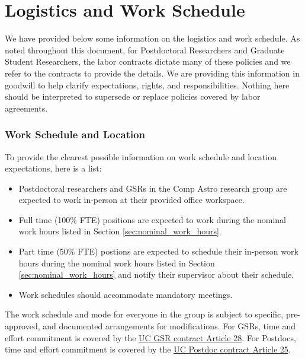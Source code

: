 \section{Logistics and Work Schedule}
\label{sec:logistics}

We have provided below some information on the logistics and work schedule. As noted throughout this document, for Postdoctoral Researchers and Graduate Student Researchers, the labor contracts dictate many of these policies and we refer to the contracts to provide the details. We are providing this information in goodwill to help
clarify expectations, rights, and responsibilities. Nothing here should be interpreted to supersede or replace
policies covered by labor agreements.


\subsubsection{Work Schedule and Location}

To provide the clearest possible information on work schedule and location expectations, here is a list:

\begin{itemize}
	\item Postdoctoral researchers and GSRs in the Comp Astro research group are expected to work in-person at their provided office workspace.
	\item Full time (100\% FTE) positions are expected to work during the nominal work hours listed in Section \ref{sec:nominal_work_hours}.
	\item Part time (50\% FTE) postions are expected to schedule their in-person work hours during the nominal work hours listed in Section \ref{sec:nominal_work_hours} and notify their supervisor about their schedule.
	\item Work schedules should accommodate mandatory meetings.
\end{itemize}

\noindent
The work schedule and mode for everyone in the group is subject to specific, pre-approved, and documented arrangements for modifications. For GSRs, time and effort commitment is covered by the \href{https://qa.ucnet.universityofcalifornia.edu/labor/bargaining-units/br/docs/br_28_time-and-effort-commitment_2022-2025.pdf}{UC GSR contract Article 28}. For Postdocs, time
and effort commitment is covered by the \href{https://ucnet.universityofcalifornia.edu/wp-content/uploads/labor/bargaining-units/px/docs/px_tentative_agremeents_effective_12-09-2022.pdf}{UC Postdoc contract Article 25}.\\


